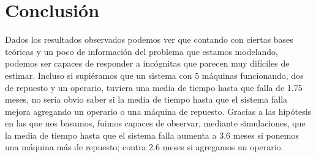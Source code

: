 \documentclass[12pt]{article}
\begin{document}
\clearpage

\section{Conclusión}

Dados los resultados observados podemos ver que contando con ciertas bases teóricas y un poco de información
del problema que estamos modelando, podemos ser capaces de responder a incógnitas que parecen muy difíciles
de estimar. Incluso si supiéramos que un sistema con 5 máquinas funcionando, dos de repuesto y un operario,
tuviera una media de tiempo hasta que falla de 1.75 meses, no sería obvio saber si la media de tiempo hasta
que el sistema falla mejora agregando un operario o una máquina de repuesto.
Gracias a las hipótesis en las que nos basamos, fuimos capaces de observar, mediante simulaciones, que
la media de tiempo hasta que el sistema falla aumenta a 3.6 meses si ponemos una máquina más de repuesto;
contra 2.6 meses si agregamos un operario.
\end{document}

